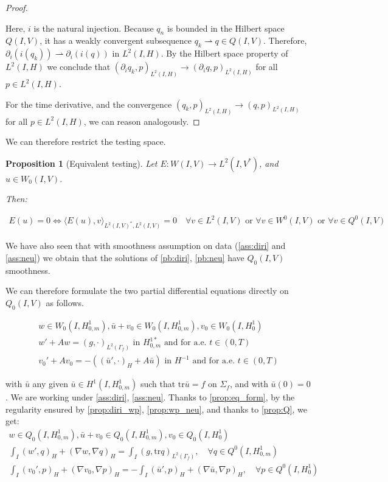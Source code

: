\documentclass[english,a4paper,9pt,oneside]{scrbook}	%
\theoremstyle{break}
\newtheorem{prop}[equation]{Proposition}
\newenvironment{mproof}[1][\proofname]{%
  \begin{proof}[#1]$ $\par\nobreak\ignorespaces
}{%
  \end{proof}
}
\renewcommand*{\proofname}{Proof}
\theoremstyle{remark}
\newcommand{\tr}{\text{tr}}
\newcommand{\weakc}{\rightharpoonup}
\begin{document}
\begin{appendices}
\begin{mproof}
Here, $i$ is the natural injection. Because $q_n$ is bounded in the Hilbert space $Q(I,V)$, it has a weakly convergent subsequence $q_k\weakc q \in Q(I,V)$. Therefore, $\partial_i (i(q_k))\weakc \partial_i (i(q))$ in $L^2(I,H)$. By the Hilbert space property of $L^2(I,H)$ we conclude that $(\partial_i q_k,p)_{L^2(I,H)}\rightarrow (\partial_i q,p)_{L^2(I,H)}$ for all $p \in L^2(I,H)$.

For the time derivative, and the convergence $(q_k,p)_{L^2(I,H)}\rightarrow (q,p)_{L^2(I,H)}$ for all $p \in L^2(I,H)$, we can reason analogously.
\end{mproof}

We can therefore restrict the testing space.

\begin{prop}[Equivalent testing]
\label{prop:eq_test}
Let $E: W(I,V)\rightarrow L^2(I,V^*)$, and $u\in W_0(I,V)$.

Then:

\begin{align*}
E(u)=0 
\iff 
\langle E(u), v\rangle_{L^2(I,V)^*, L^2(I,V)}=0 \quad \forall v \in L^2(I,V) \text{ or }\forall v \in W^0(I,V) \text{ or } \forall v \in Q^0(I,V) 
\end{align*}

\end{prop}


We have also seen that with smoothness assumption on data (\cref{ass:diri} and \cref{ass:neu}) we obtain that the solutions of \cref{pb:diri}, \cref{pb:neu} have $Q_0(I,V)$ smoothness. 

We can therefore formulate the two partial differential equations directly on $Q_0(I,V)$ as follows.

\begin{align*}
w \in W_0(I, H^1_{0,m}),\bar{u}+v_0 \in W_0(I,H^1_{0,m}), v_0 \in W_0(I,H^1_0)\\
w' + A w = (g,\cdot)_{L^2(\Gamma_f)} \text{ in }H^{1*}_{0,m} \text{ and for a.e. } t \in (0,T) \\
v_0' + A v_0 = -((\bar{u}',\cdot)_H+A \bar{u}) \text{ in }H^{-1} \text{ and for a.e. } t \in (0,T) 
\end{align*}

with $\bar{u}$ any given $\bar{u}\in H^1(I,H^1_{0,m})$ such that $\tr \bar{u} =f$ on $\Sigma_f$, and with $\bar{u}(0)=0$.
We are working under \cref{ass:diri}, \cref{ass:neu}.
Thanks to \cref{prop:eq_form}, by the regularity ensured by \cref{prop:diri_wp}, \cref{prop:wp_neu}, and thanks to \cref{prop:Q}, we get:
\begin{align*}
w \in Q_0(I, H^1_{0,m}), \bar{u}+v_0 \in Q_0(I,H^1_{0,m}), v_0 \in Q_0(I,H^1_0) \\
\int_I ( w' , q)_H+ (\nabla w, \nabla q)_H = \int_I(g,\tr q)_{L^2(\Gamma_f)}, \quad \forall q \in Q^0(I, H^1_{0,m}) \\
\int_I (v_0',p)_H + (\nabla v_0, \nabla p)_H= -\int_I(\bar{u}',p)_H+(\nabla \bar{u}, \nabla p)_H, \quad \forall p \in Q^0(I, H^1_0) 
\end{align*}


\end{appendices}
\end{document}
